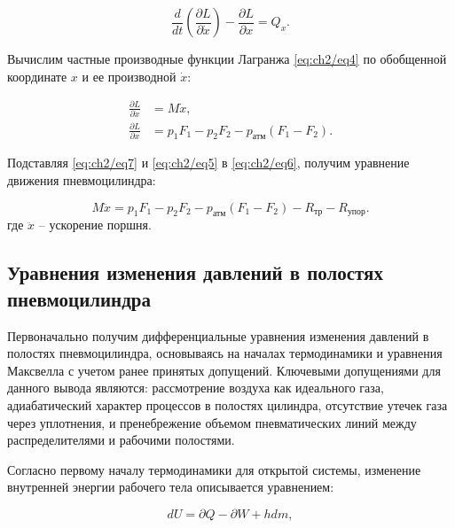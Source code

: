 \begin{equation}
\label{eq:ch2/eq6}
    \frac{d}{dt} \left( \frac{\partial L}{\partial \dot{x}} \right) - \frac{\partial L}{\partial x} = Q_x.
\end{equation}

Вычислим частные производные функции Лагранжа \eqref{eq:ch2/eq4} по обобщенной координате $x$ и ее производной $\dot{x}$:

\begin{equation}
\label{eq:ch2/eq7}
    \begin{aligned}
        \frac{\partial L}{\partial \dot{x}} & = M \dot{x},                                    \\
        \frac{\partial L}{\partial x}       & = p_1 F_1 - p_2 F_2 - p_\text{атм} (F_1 - F_2).
    \end{aligned}
\end{equation}

Подставляя \eqref{eq:ch2/eq7} и \eqref{eq:ch2/eq5} в \eqref{eq:ch2/eq6}, получим уравнение движения пневмоцилиндра:

\begin{equation}
\label{eq:ch2/eq8}
    M \ddot{x} = p_1 F_1 - p_2 F_2 - p_\text{атм} (F_1 - F_2) - R_{\text{тр}} - R_{\text{упор}}.
\end{equation}
где $\ddot{x}$ -- ускорение поршня.

\subsection{Уравнения изменения давлений в полостях пневмоцилиндра}\label{sec:ch2/sec2/subsec2}

Первоначально получим дифференциальные уравнения изменения давлений в
полостях пневмоцилиндра, основываясь на началах термодинамики
и уравнения Максвелла с учетом ранее принятых допущений.
Ключевыми допущениями для данного вывода являются: рассмотрение
воздуха как идеального газа, адиабатический характер процессов в полостях
цилиндра, отсутствие утечек газа через уплотнения, и пренебрежение объемом
пневматических линий между распределителями и рабочими полостями.

Согласно первому началу термодинамики для открытой системы, изменение внутренней энергии рабочего тела описывается уравнением:

\begin{equation}
\label{eq:ch2/first_law}
    dU = \partial Q - \partial W + hdm,
\end{equation}


